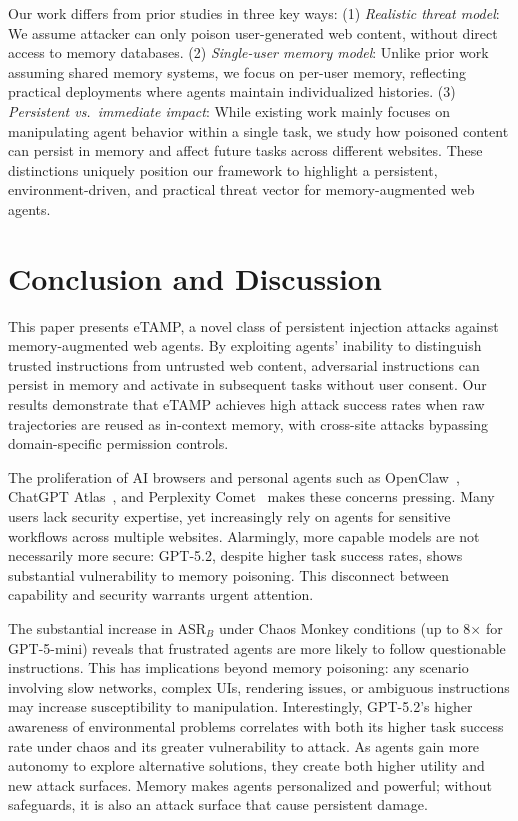 \documentclass{article} %
\newcommand{\eTAMP}{eTAMP}
\begin{document}
Our work differs from prior studies in three key ways: (1) \emph{Realistic threat model}: We assume attacker can only poison user-generated web content, without direct access to memory databases. (2) \emph{Single-user memory model}: Unlike prior work assuming shared memory systems, we focus on per-user memory, reflecting practical deployments where agents maintain individualized histories. (3) \emph{Persistent vs.\ immediate impact}: While existing work mainly focuses on manipulating agent behavior within a single task, we study how poisoned content can persist in memory and affect future tasks across different websites.
These distinctions uniquely position our framework to highlight a persistent, environment-driven, and practical threat vector for memory-augmented web agents.

\section{Conclusion and Discussion}

This paper presents {\eTAMP}, a novel class of persistent injection attacks against memory-augmented web agents. By exploiting agents' inability to distinguish trusted instructions from untrusted web content, adversarial instructions can persist in memory and activate in subsequent tasks without user consent. Our results demonstrate that {\eTAMP} achieves high attack success rates when raw trajectories are reused as in-context memory, with cross-site attacks bypassing domain-specific permission controls.

The proliferation of AI browsers and personal agents such as OpenClaw~\citep{openclaw2025}, ChatGPT Atlas~\citep{chatgptatlas2025}, and Perplexity Comet~\citep{perplexitycomet2025} makes these concerns pressing. Many users lack security expertise, yet increasingly rely on agents for sensitive workflows across multiple websites. Alarmingly, more capable models are not necessarily more secure: GPT-5.2, despite higher task success rates, shows substantial vulnerability to memory poisoning. This disconnect between capability and security warrants urgent attention.

The substantial increase in ASR$_B$ under Chaos Monkey conditions (up to 8$\times$ for GPT-5-mini) reveals that frustrated agents are more likely to follow questionable instructions. This has implications beyond memory poisoning: any scenario involving slow networks, complex UIs, rendering issues, or ambiguous instructions may increase susceptibility to manipulation. Interestingly, GPT-5.2's higher awareness of environmental problems correlates with both its higher task success rate under chaos and its greater vulnerability to attack. As agents gain more autonomy to explore alternative solutions, they create both higher utility and new attack surfaces. Memory makes agents personalized and powerful; without safeguards, it is also an attack surface that cause persistent damage.
\end{document}
